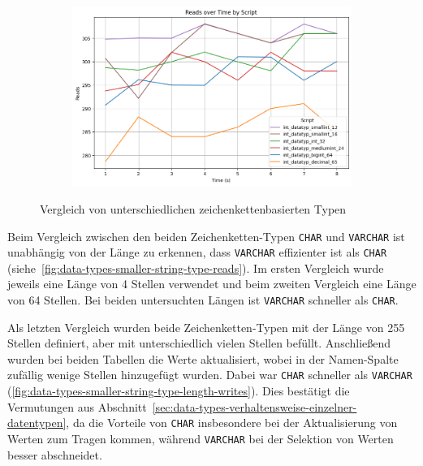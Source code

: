 \vspace{-12pt}
\begin{figure}[H]
    \centering
    \begin{subfigure}[t]{0.48\textwidth}
        \centering
        \includegraphics[width=\textwidth]{PNGs/Script/Data_Types/Smaller/number-type/Reads}
    \end{subfigure}
    \vspace{-10pt}
    \caption[Datentypen: Numerische Datentypen]{Vergleich von unterschiedlichen zeichenkettenbasierten Typen}
    \label{data-types-smaller-number-type-reads}
\end{figure}
\vspace{-20pt}

Beim Vergleich zwischen den beiden Zeichenketten-Typen \texttt{CHAR} und \texttt{VARCHAR} ist unabhängig von der Länge zu erkennen, dass \texttt{VARCHAR} effizienter ist als \texttt{CHAR} (siehe~\ref{fig:data-types-smaller-string-type-reads}).
Im ersten Vergleich wurde jeweils eine Länge von 4 Stellen verwendet und beim zweiten Vergleich eine Länge von 64 Stellen.
Bei beiden untersuchten Längen ist \texttt{VARCHAR} schneller als \texttt{CHAR}.

Als letzten Vergleich wurden beide Zeichenketten-Typen mit der Länge von 255 Stellen definiert, aber mit unterschiedlich vielen Stellen befüllt.
Anschließend wurden bei beiden Tabellen die Werte aktualisiert, wobei in der Namen-Spalte zufällig wenige Stellen hinzugefügt wurden.
Dabei war \texttt{CHAR} schneller als \texttt{VARCHAR} (\ref{fig:data-types-smaller-string-type-length-writes}).
Dies bestätigt die Vermutungen aus Abschnitt~\ref{sec:data-types-verhaltensweise-einzelner-datentypen}, da die Vorteile von \texttt{CHAR} insbesondere bei der Aktualisierung von Werten zum Tragen kommen, während \texttt{VARCHAR} bei der Selektion von Werten besser abschneidet.

